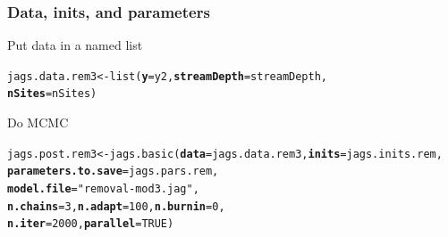 \documentclass[color=usenames,dvipsnames]{beamer}\usepackage[]{graphicx}\usepackage[]{color}
\makeatletter
\newcommand{\hlnum}[1]{\textcolor[rgb]{0.69,0.494,0}{#1}}%
\newcommand{\hlstr}[1]{\textcolor[rgb]{0.749,0.012,0.012}{#1}}%
\newcommand{\hlstd}[1]{\textcolor[rgb]{0,0,0}{#1}}%
\newcommand{\hlkwb}[1]{\textcolor[rgb]{0,0.341,0.682}{#1}}%
\newcommand{\hlkwc}[1]{\textcolor[rgb]{0,0,0}{\textbf{#1}}}%
\newcommand{\hlkwd}[1]{\textcolor[rgb]{0.004,0.004,0.506}{#1}}%
\newenvironment{kframe}{%
 \def\at@end@of@kframe{}%
 \ifinner\ifhmode%
  \def\at@end@of@kframe{\end{minipage}}%
  \begin{minipage}{\columnwidth}%
 \fi\fi%
 \def\FrameCommand##1{\hskip\@totalleftmargin \hskip-\fboxsep
 \colorbox{shadecolor}{##1}\hskip-\fboxsep
     \hskip-\linewidth \hskip-\@totalleftmargin \hskip\columnwidth}%
 \MakeFramed {\advance\hsize-\width
   \@totalleftmargin\z@ \linewidth\hsize
   \@setminipage}}%
 {\par\unskip\endMakeFramed%
 \at@end@of@kframe}
\newenvironment{knitrout}{}{} %
\makeatother
\begin{document}
\begin{frame}[fragile]
  \frametitle{Data, inits, and parameters}
  Put data in a named list
  \vspace{-12pt}
\begin{knitrout}\small
{}\color{fgcolor}\begin{kframe}
\begin{alltt}
\hlstd{jags.data.rem3} \hlkwb{<-} \hlkwd{list}\hlstd{(}\hlkwc{y}\hlstd{=y2,} \hlkwc{streamDepth}\hlstd{=streamDepth,}
                       \hlkwc{nSites}\hlstd{=nSites)}
\end{alltt}
\end{kframe}
\end{knitrout}
\vfill
  Do MCMC
\begin{knitrout}\scriptsize
{}\color{fgcolor}\begin{kframe}
\begin{alltt}
\hlstd{jags.post.rem3} \hlkwb{<-} \hlkwd{jags.basic}\hlstd{(}\hlkwc{data}\hlstd{=jags.data.rem3,} \hlkwc{inits}\hlstd{=jags.inits.rem,}
                             \hlkwc{parameters.to.save}\hlstd{=jags.pars.rem,}
                             \hlkwc{model.file}\hlstd{=}\hlstr{"removal-mod3.jag"}\hlstd{,}
                             \hlkwc{n.chains}\hlstd{=}\hlnum{3}\hlstd{,} \hlkwc{n.adapt}\hlstd{=}\hlnum{100}\hlstd{,} \hlkwc{n.burnin}\hlstd{=}\hlnum{0}\hlstd{,}
                             \hlkwc{n.iter}\hlstd{=}\hlnum{2000}\hlstd{,} \hlkwc{parallel}\hlstd{=}\hlnum{TRUE}\hlstd{)}
\end{alltt}
\end{kframe}
\end{knitrout}
\end{frame}
\end{document}
